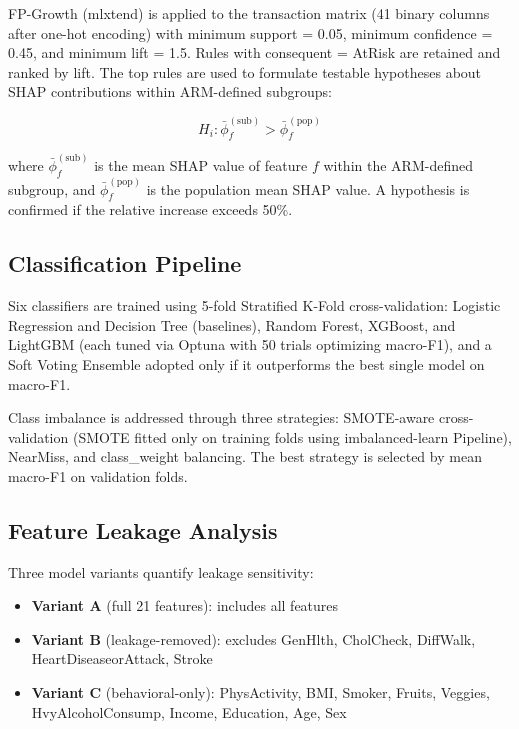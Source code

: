 ﻿\documentclass[12pt,a4paper]{article}
\begin{document}
FP-Growth (mlxtend) is applied to the transaction matrix (41 binary columns after one-hot
encoding) with minimum support = 0.05, minimum confidence = 0.45, and minimum lift = 1.5.
Rules with consequent = AtRisk are retained and ranked by lift. The top rules are used to
formulate testable hypotheses about SHAP contributions within ARM-defined subgroups:

\begin{equation}
H_i: \bar{\phi}_f^{(\text{sub})} > \bar{\phi}_f^{(\text{pop})}
\end{equation}

where $\bar{\phi}_f^{(\text{sub})}$ is the mean SHAP value of feature $f$ within the
ARM-defined subgroup, and $\bar{\phi}_f^{(\text{pop})}$ is the population mean SHAP value.
A hypothesis is confirmed if the relative increase exceeds 50\%.

\subsection{Classification Pipeline}

Six classifiers are trained using 5-fold Stratified K-Fold cross-validation:
Logistic Regression and Decision Tree (baselines), Random Forest, XGBoost, and LightGBM
(each tuned via Optuna with 50 trials optimizing macro-F1), and a Soft Voting Ensemble
adopted only if it outperforms the best single model on macro-F1.

Class imbalance is addressed through three strategies: SMOTE-aware cross-validation
(SMOTE fitted only on training folds using imbalanced-learn Pipeline), NearMiss, and
class\_weight balancing. The best strategy is selected by mean macro-F1 on validation folds.

\subsection{Feature Leakage Analysis}

Three model variants quantify leakage sensitivity:
\begin{itemize}
    \item \textbf{Variant A} (full 21 features): includes all features
    \item \textbf{Variant B} (leakage-removed): excludes GenHlth, CholCheck, DiffWalk,
    HeartDiseaseorAttack, Stroke
    \item \textbf{Variant C} (behavioral-only): PhysActivity, BMI, Smoker, Fruits, Veggies,
    HvyAlcoholConsump, Income, Education, Age, Sex
\end{itemize}
\end{document}
